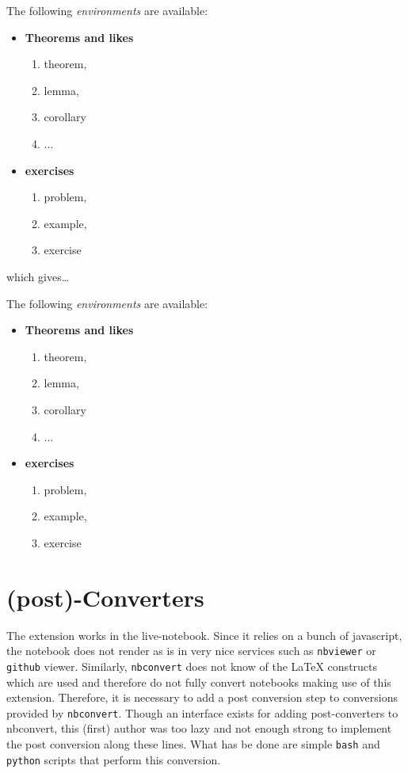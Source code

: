     \begin{listing}
The following \textit{environments} are available:
\begin{itemize}
    \item \textbf{Theorems and likes}
    \begin{enumerate}
        \item theorem,
        \item lemma,
        \item corollary
        \item ...
    \end{enumerate}
    \item \textbf{exercises}
    \begin{enumerate}
        \item problem,
        \item example,
        \item exercise
    \end{enumerate}
\end{itemize}
\end{listing}

    which gives\ldots{}

The following \textit{environments} are available:

\begin{itemize}
\item \textbf{Theorems and likes}
\begin{enumerate}
\item theorem,
\item lemma,
\item corollary
\item ...
\end{enumerate}
\item \textbf{exercises}
\begin{enumerate}
\item problem,
\item example,
\item exercise
\end{enumerate}
\end{itemize}

    \section{(post)-Converters}\label{post-converters}

    The extension works in the live-notebook. Since it relies on a bunch of
javascript, the notebook does not render as is in very nice services
such as \texttt{nbviewer} or \texttt{github} viewer. Similarly,
\texttt{nbconvert} does not know of the LaTeX constructs which are used
and therefore do not fully convert notebooks making use of this
extension. Therefore, it is necessary to add a post conversion step to
conversions provided by \texttt{nbconvert}. Though an interface exists
for adding post-converters to nbconvert, this (first) author was too
lazy and not enough strong to implement the post conversion along these
lines. What has be done are simple \texttt{bash} and \texttt{python}
scripts that perform this conversion.

